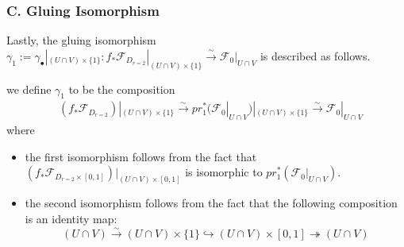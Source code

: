 \subsubsection{C. Gluing Isomorphism}
Lastly, the gluing isomorphism $\gamma_1 := \gamma_\bullet|_{(U\cap V)\times \{1\}}:  f_*\mathscr{F}_{D_{r=2}}|_{(U\cap V)\times \{1\}}\xrightarrow{\sim} \mathscr{F}_0|_{U\cap V}$ is described as follows.

\begin{definition}
we define $\gamma_1$ to be the composition
\begin{align*}
&(f_*\mathscr{F}_{D_{r=2}})|_{(U\cap V)\times \{1\}}\xrightarrow{\sim}pr_1^*(\mathscr{F}_0|_{U\cap V})|_{(U\cap V)\times \{1\}}\xrightarrow{\sim}\mathscr{F}_0|_{U\cap V}
\end{align*}
where
\begin{itemize}
\item the first isomorphism follows from the fact that $(f_*\mathscr{F}_{D_{r=2}\times [0,1]})|_{(U\cap V)\times[0,1]}$ is isomorphic to $pr_1^*(\mathscr{F}_0|_{U\cap V})$.

\item the second isomorphism follows from the fact that the following composition is an identity map:
\[
(U\cap V)\xrightarrow{\sim} (U\cap V)\times \{1\} \hookrightarrow (U\cap V)\times [0,1] \twoheadrightarrow (U\cap V)
\]
\end{itemize}
\end{definition}